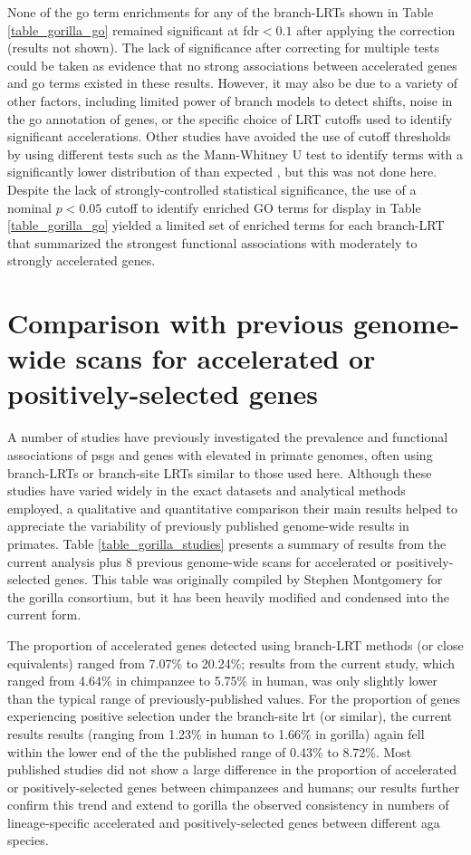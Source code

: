 None of the \ac{go} term enrichments for any of the branch-LRTs shown
in Table \ref{table_gorilla_go} remained significant at \ac{fdr}$<0.1$
after applying the \citet{Benjamini1995} correction (results not
shown). The lack of significance after correcting for multiple tests
could be taken as evidence that no strong associations between
accelerated genes and \ac{go} terms existed in these results. However,
it may also be due to a variety of other factors, including limited
power of branch models to detect \dnds shifts, noise in the \ac{go}
annotation of genes, or the specific choice of LRT cutoffs used to
identify significant accelerations. Other studies have avoided the use
of cutoff thresholds by using different tests such as the Mann-Whitney
U test to identify terms with a significantly lower distribution of
\pvs than expected \citep{Clark2003,Kosiol2008}, but this was not done
here. Despite the lack of strongly-controlled statistical
significance, the use of a nominal $p<0.05$ cutoff to identify
enriched GO terms for display in Table \ref{table_gorilla_go} yielded
a limited set of enriched terms for each branch-LRT that summarized
the strongest functional associations with moderately to strongly
accelerated genes.

\section{Comparison with previous genome-wide scans for accelerated or positively-selected genes}

A number of studies have previously investigated the prevalence and
functional associations of \acp{psg} and genes with elevated \dnds in
primate genomes, often using branch-LRTs or branch-site LRTs similar
to those used here. Although these studies have varied widely in the
exact datasets and analytical methods employed, a qualitative and
quantitative comparison their main results helped to appreciate the
variability of previously published genome-wide results in
primates. Table \ref{table_gorilla_studies} presents a summary of
results from the current analysis plus 8 previous genome-wide scans
for accelerated or positively-selected genes. This table was
originally compiled by Stephen Montgomery for the gorilla consortium,
but it has been heavily modified and condensed into the current form.

The proportion of accelerated genes detected using branch-LRT methods
(or close equivalents) ranged from 7.07\% to 20.24\%; results from the
current study, which ranged from 4.64\% in chimpanzee to 5.75\% in
human, was only slightly lower than the typical range of
previously-published values. For the proportion of genes experiencing
positive selection under the branch-site \ac{lrt} (or similar), the
current results results (ranging from 1.23\% in human to 1.66\% in
gorilla) again fell within the lower end of the the published range of
0.43\% to 8.72\%. Most published studies did not show a large
difference in the proportion of accelerated or positively-selected
genes between chimpanzees and humans; our results further confirm this
trend and extend to gorilla the observed consistency in numbers of
lineage-specific accelerated and positively-selected genes between
different \ac{aga} species.

